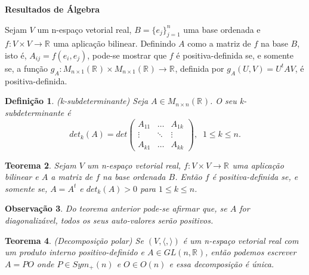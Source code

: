 \documentclass{beamer}
\newcommand{\titulo}[1]{\centering \textbf{#1}}
\newtheorem{teorema}{Teorema}[section]
\newtheorem{definicao}[teorema]{Definição}
\newtheorem{observacao}[teorema]{Observação}
\newcommand{\generalgroup}[2]{GL(#1, #2)}
\newcommand{\generalgroupreal}[1]{\generalgroup{#1}{\real{}}}
\newcommand{\matrizortogonal}[1]{O(#1)}
\newcommand{\matrizquadreal}[1]{M_{#1 \times #1}(\real{})}
\newcommand{\matrizsimetricapositiva}[1]{Sym_{+}(#1)}
\newcommand{\produtointerno}[2]{\langle #1, #2 \rangle}
\newcommand{\real}[1]{\mathbb{R}^{#1}}
\newcommand{\reta}{\real{}}
\begin{document}
\begin{frame}
	\titulo{Resultados de Álgebra}
		
	Sejam $V$ um n-espaço vetorial real, $B= \{e_{j}\}_{j=1}^{n}$ uma base ordenada e $f:V\times V\to \reta$ uma aplicação bilinear. Definindo $A$ como a matriz de $f$ na base $B$, isto é, $A_{ij} = f(e_{i}, e_{j})$, pode-se mostrar que $f$ é positiva-definida se, e somente se, a função $g_{A}: M_{n\times 1}(\reta)\times M_{n\times 1}(\reta) \to \reta$, definida por $
		g_{A}(U,V) = U^{t}AV$, é positiva-definida.
	
	\begin{definicao}
		(k-subdeterminante) Seja $A \in \matrizquadreal{n}$. O seu k-subdeterminante é
		$$
		det_{k}(A) =
		det \left(
		\begin{array}{ccc}
		A_{11} & \dots & A_{1k}
		\\
		\vdots & \ddots & \vdots
		\\
		A_{k1} & \dots & A_{kk}
		\end{array}
		\right),\;\; 1\leq k \leq n.
		$$
	\end{definicao}	
\end{frame}

\begin{frame}
	\begin{teorema}
		Sejam $V$ um n-espaço vetorial real, $f: V\times V\to \reta$ uma aplicação bilinear e $A$ a matriz de $f$ na base ordenada $B$. Então $f$ é positiva-definida se, e somente se, $A=A^{t}$ e $det_{k}(A)>0$ para $1\leq k\leq n$.
	\end{teorema}
	
	\begin{observacao}
		Do teorema anterior pode-se afirmar que, se $A$ for diagonalizável, todos os seus auto-valores serão positivos.
	\end{observacao}
	
	
	\begin{teorema}
		(Decomposição polar) Se $(V, \produtointerno{}{})$ é um n-espaço vetorial real com um produto interno positivo-definido e $A \in \generalgroupreal{n}$, então podemos escrever $A=PO$ onde $P \in  \matrizsimetricapositiva{n}$ e $O \in \matrizortogonal{n}$ e essa decomposição é única.
	\end{teorema}
\end{frame}
\end{document}
